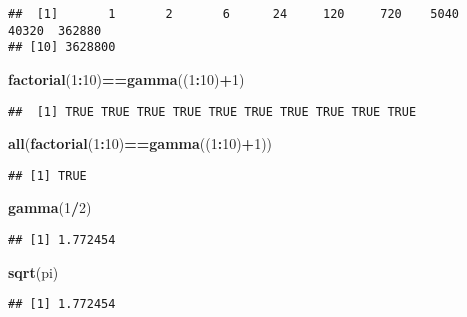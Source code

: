 \documentclass[
]{article}
\newenvironment{Shaded}{\begin{snugshade}}{\end{snugshade}}
\newcommand{\DecValTok}[1]{\textcolor[rgb]{0.00,0.00,0.81}{#1}}
\newcommand{\FunctionTok}[1]{\textcolor[rgb]{0.13,0.29,0.53}{\textbf{#1}}}
\newcommand{\NormalTok}[1]{#1}
\newcommand{\SpecialCharTok}[1]{\textcolor[rgb]{0.81,0.36,0.00}{\textbf{#1}}}
\begin{document}
\begin{verbatim}
##  [1]       1       2       6      24     120     720    5040   40320  362880
## [10] 3628800
\end{verbatim}

\begin{Shaded}
\begin{Highlighting}[]
\FunctionTok{factorial}\NormalTok{(}\DecValTok{1}\SpecialCharTok{:}\DecValTok{10}\NormalTok{)}\SpecialCharTok{==}\FunctionTok{gamma}\NormalTok{((}\DecValTok{1}\SpecialCharTok{:}\DecValTok{10}\NormalTok{)}\SpecialCharTok{+}\DecValTok{1}\NormalTok{)}
\end{Highlighting}
\end{Shaded}

\begin{verbatim}
##  [1] TRUE TRUE TRUE TRUE TRUE TRUE TRUE TRUE TRUE TRUE
\end{verbatim}

\begin{Shaded}
\begin{Highlighting}[]
\FunctionTok{all}\NormalTok{(}\FunctionTok{factorial}\NormalTok{(}\DecValTok{1}\SpecialCharTok{:}\DecValTok{10}\NormalTok{)}\SpecialCharTok{==}\FunctionTok{gamma}\NormalTok{((}\DecValTok{1}\SpecialCharTok{:}\DecValTok{10}\NormalTok{)}\SpecialCharTok{+}\DecValTok{1}\NormalTok{))}
\end{Highlighting}
\end{Shaded}

\begin{verbatim}
## [1] TRUE
\end{verbatim}

\begin{Shaded}
\begin{Highlighting}[]
\FunctionTok{gamma}\NormalTok{(}\DecValTok{1}\SpecialCharTok{/}\DecValTok{2}\NormalTok{)}
\end{Highlighting}
\end{Shaded}

\begin{verbatim}
## [1] 1.772454
\end{verbatim}

\begin{Shaded}
\begin{Highlighting}[]
\FunctionTok{sqrt}\NormalTok{(pi)}
\end{Highlighting}
\end{Shaded}

\begin{verbatim}
## [1] 1.772454
\end{verbatim}
\end{document}
